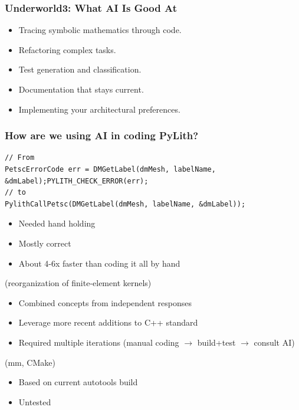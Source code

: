 \documentclass[aspectratio=169,hyperref=colorlinks]{beamer}
\begin{document}
\begin{frame}
  \frametitle{Underworld3: What AI Is Good At}

  \begin{itemize}
  \item Tracing symbolic mathematics through code.
  \item Refactoring complex tasks.
  \item Test generation and classification.
  \item Documentation that stays current.
  \item Implementing your architectural preferences.
  \end{itemize}
\end{frame}


\begin{frame}[fragile]
  \frametitle{How are we using AI in coding PyLith?}
  \summary{}

  \begin{itemize}
  {\scriptsize
\begin{verbatim}
// From
PetscErrorCode err = DMGetLabel(dmMesh, labelName, &dmLabel);PYLITH_CHECK_ERROR(err);
// to
PylithCallPetsc(DMGetLabel(dmMesh, labelName, &dmLabel));
\end{verbatim}
  }\pause
    \begin{itemize}
    \item Needed hand holding
    \item Mostly correct
    \item About 4-6x faster than coding it all by hand
    \end{itemize}\pause
   (reorganization of finite-element kernels)
    \begin{itemize}
    \item Combined concepts from independent responses
    \item Leverage more recent additions to C++ standard
    \item Required multiple iterations (manual coding $\rightarrow$ build+test $\rightarrow$ consult AI)
    \end{itemize}\pause
   (mm, CMake)
    \begin{itemize}
    \item Based on current autotools build
    \item Untested
    \end{itemize}
  \end{itemize}

\end{frame}
\end{document}
